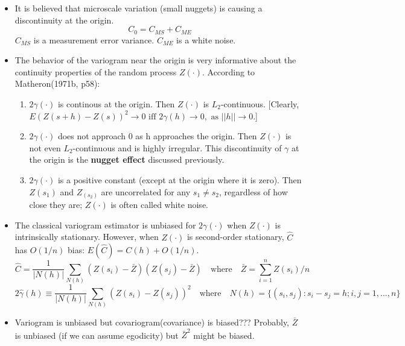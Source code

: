 \documentclass[11pt]{article}
\begin{document}
\begin{itemize}
\item It is believed that microscale variation (small nuggets) is causing a discontinuity at the origin.
$$C_0 = C_{MS} + C_{ME}$$
$C_{MS}$ is a measurement error variance. $C_{ME}$ is a white noise.\\

\item
The behavior of the variogram near the origin is very informative about the continuity properties of the random process $Z(\cdot)$. 
According to Matheron(1971b, p58):\\

\begin{enumerate}

	\item $2\gamma(\cdot)$ is continous at the origin. Then $Z(\cdot)$ is $L_2$-continuous. [Clearly, $E(Z(s+h) - Z(s) )^2 \rightarrow 0 \text{ iff } 2\gamma(h) \rightarrow 0, \text{ as } ||h|| \rightarrow 0.$]

	\item  $2\gamma(\cdot)$ does not approach 0 as h approaches the origin. Then $Z(\cdot)$ is not even $L_2$-continuous and is highly irregular. This discontinuity of $\gamma$ at the origin is the \textbf{nugget effect} discussed previously.\\
	
	\item $2\gamma(\cdot)$ is a positive constant (except at the origin where it is zero). Then $Z(s_1)$ and $Z_(s_2)$ are uncorrelated for any $s_1 \ne s_2$, regardless of how close they are; $Z(\cdot)$ is often called white noise.\\
\end{enumerate}

\item The classical variogram estimator is unbiased for $2\gamma(\cdot)$ when $Z(\cdot)$ is intrinsically stationary. However, when $Z(\cdot)$ is second-order stationary, $\hat{C}$ has $O(1/n)$ bias: $E(\hat{C}) = C(h) + O(1/n)$.\\
$$ \hat{C} = \frac{1}{|N(h)|} \sum_{N(h)} (Z(s_i) - \bar{Z}) (Z(s_j) - \bar{Z}) \quad \text{where} \quad \bar{Z} = \sum_{i=1}^n Z(s_i)/n $$
$$ 2\hat{\gamma}(h) \equiv \frac{1}{|N(h)|} \sum_{N(h)} (Z(s_i) - Z(s_j))^2 \quad \text{where} \quad N(h) = \{(s_i,s_j): s_i-s_j=h; i,j=1,...,n\} $$

\item Variogram is unbiased but covariogram(covariance) is biased??? Probably, $\bar{Z}$ is unbiased (if we can assume egodicity) but $\bar{Z}^2$ might be biased.\\


\end{itemize}
\end{document}
